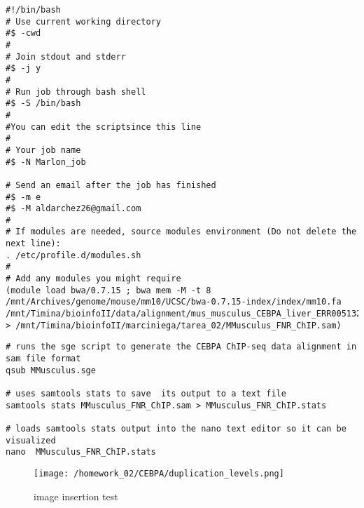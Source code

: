 \documentclass[
]{article}
\begin{document}
\begin{verbatim}
#!/bin/bash
# Use current working directory
#$ -cwd
#
# Join stdout and stderr
#$ -j y
#
# Run job through bash shell
#$ -S /bin/bash
#
#You can edit the scriptsince this line
#
# Your job name
#$ -N Marlon_job

# Send an email after the job has finished
#$ -m e
#$ -M aldarchez26@gmail.com
#
# If modules are needed, source modules environment (Do not delete the next line):
. /etc/profile.d/modules.sh
#
# Add any modules you might require
(module load bwa/0.7.15 ; bwa mem -M -t 8 /mnt/Archives/genome/mouse/mm10/UCSC/bwa-0.7.15-index/index/mm10.fa /mnt/Timina/bioinfoII/data/alignment/mus_musculus_CEBPA_liver_ERR005132.fastq.gz > /mnt/Timina/bioinfoII/marciniega/tarea_02/MMusculus_FNR_ChIP.sam)
\end{verbatim}

\begin{verbatim}
# runs the sge script to generate the CEBPA ChIP-seq data alignment in sam file format
qsub MMusculus.sge

# uses samtools stats to save  its output to a text file
samtools stats MMusculus_FNR_ChIP.sam > MMusculus_FNR_ChIP.stats

# loads samtools stats output into the nano text editor so it can be visualized
nano  MMusculus_FNR_ChIP.stats
\end{verbatim}

\begin{figure}
\centering
\texttt{[image: /homework\_02/CEBPA/duplication\_levels.png]}
\caption{image insertion test}
\end{figure}
\end{document}
